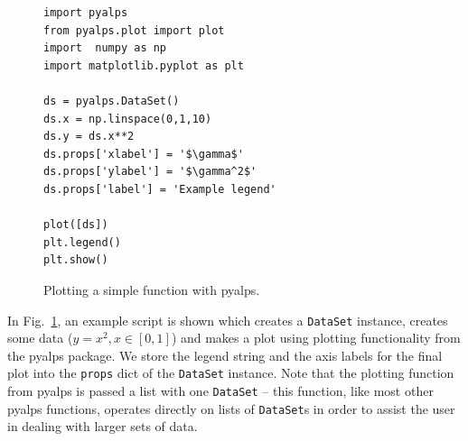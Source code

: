 \documentclass[12pt]{iopart}
\begin{document}
\begin{figure}
\begin{lstlisting}
import pyalps
from pyalps.plot import plot
import  numpy as np
import matplotlib.pyplot as plt

ds = pyalps.DataSet()
ds.x = np.linspace(0,1,10)
ds.y = ds.x**2
ds.props['xlabel'] = '$\gamma$'
ds.props['ylabel'] = '$\gamma^2$'
ds.props['label'] = 'Example legend'

plot([ds])
plt.legend()
plt.show()
\end{lstlisting}
\caption{Plotting a simple function with pyalps.}
\label{fig:plotting}
\end{figure}

In Fig.~\ref{fig:plotting}, an example script is shown which creates a {\tt DataSet} instance, creates some data ($y = x^2, x \in [0,1]$) and makes a plot using plotting functionality from the pyalps package. We store the legend string and the axis labels for the final plot into the {\tt props} dict of the {\tt DataSet} instance. Note that the plotting function from pyalps is passed a list with one {\tt DataSet} -- this function, like most other pyalps functions, operates directly on lists of {\tt DataSet}s in order to assist the user in dealing with larger sets of data.

\end{document}
